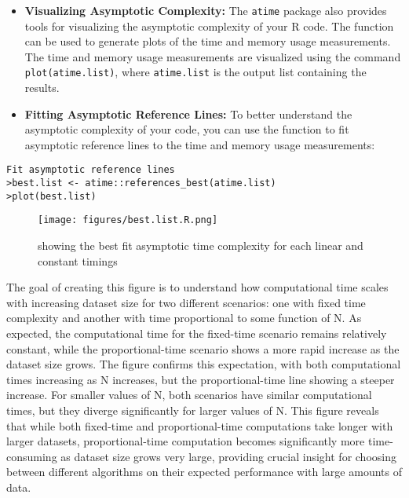 \begin{itemize}
\item \textbf{Visualizing Asymptotic Complexity:} The \texttt{atime} package also provides tools for visualizing the asymptotic complexity of your R code. The  function can be used to generate plots of the time and memory usage measurements. The time and memory usage measurements are visualized using the command \texttt{plot(atime.list)}, where \texttt{atime.list} is the output list containing the results.

\vspace{0.1in}
\item \textbf{Fitting Asymptotic Reference Lines:} To better understand the asymptotic complexity of your code, you can use the  function to fit asymptotic reference lines to the time and memory usage measurements:

\end{itemize}

\begin{lstlisting}
Fit asymptotic reference lines
>best.list <- atime::references_best(atime.list)
>plot(best.list)
\end{lstlisting}
\vspace{0.1in}

\begin{figure}[H]
    \centering
    \texttt{[image: figures/best.list.R.png]}
    \caption{showing the best fit asymptotic time complexity for each linear and constant timings}
    \label{fig:label1}
\end{figure}

\noindent The goal of creating this figure is to understand how computational time scales with increasing dataset size for two different scenarios: one with fixed time complexity and another with time proportional to some function of N. As expected, the computational time for the fixed-time scenario remains relatively constant, while the proportional-time scenario shows a more rapid increase as the dataset size grows. The figure confirms this expectation, with both computational times increasing as N increases, but the proportional-time line showing a steeper increase. For smaller values of N, both scenarios have similar computational times, but they diverge significantly for larger values of N. This figure reveals that while both fixed-time and proportional-time computations take longer with larger datasets, proportional-time computation becomes significantly more time-consuming as dataset size grows very large, providing crucial insight for choosing between different algorithms on their expected performance with large amounts of data.\\



